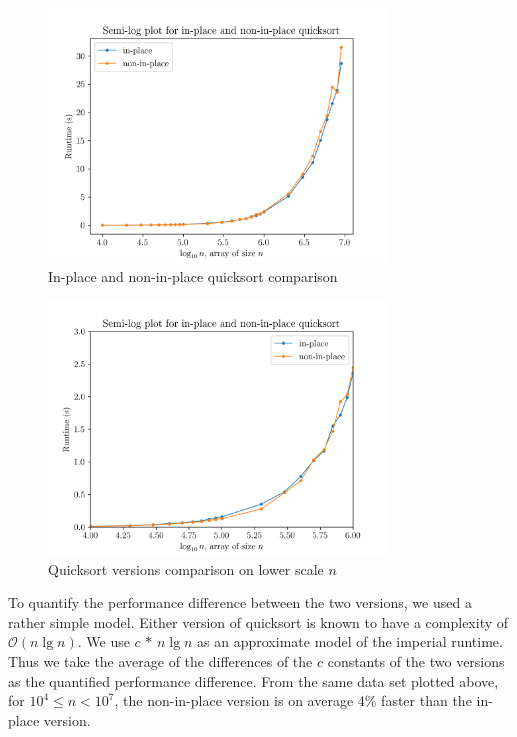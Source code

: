 \documentclass[titlepage, 12pt]{article}
\begin{document}
\begin{figure}[h]
  \centering
  \includegraphics[width=0.8\textwidth]{ip-ax}
  \caption{In-place and non-in-place quicksort comparison}
  \label{fig:ip-ax}
\end{figure}
\begin{figure}[h]
  \centering
  \includegraphics[width=0.8\textwidth]{ip-ax-zoomed} 
  \caption{Quicksort versions comparison on lower scale \( n \)}
  \label{fig:ip-ax-zoomed}
\end{figure}

To quantify the performance difference between the two versions, we used a
rather simple model. Either version of quicksort is known to have a complexity
of \( \mathcal{O}(n\lg{n}) \). We use \( c\,*\,n\lg{n} \) as an approximate model
of the imperial runtime. Thus we take the average of the differences of the \( c
\) constants of the two versions as the quantified performance difference. From
the same data set plotted above, for \( 10^4 \leq n < 10^7 \), the non-in-place
version is on average 4\% faster than the in-place version.
\end{document}
